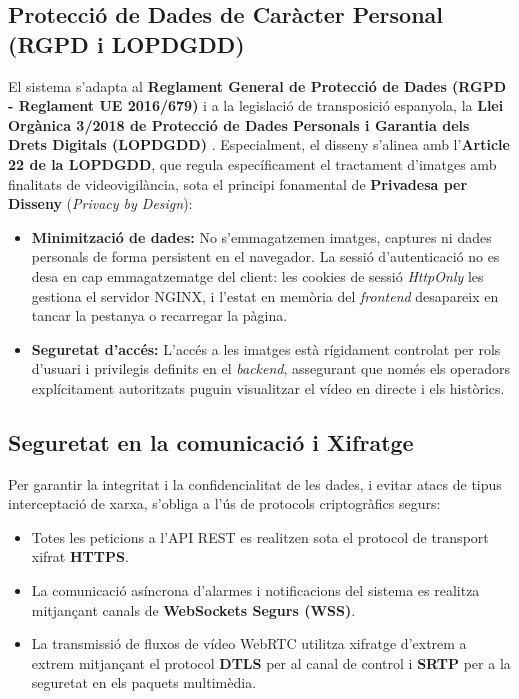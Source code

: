 \subsection{Protecció de Dades de Caràcter Personal (RGPD i LOPDGDD)}
El sistema s'adapta al \textbf{Reglament General de Protecció de Dades (RGPD - Reglament UE 2016/679)} \cite{gdpr_reg} i a la legislació de transposició espanyola, la \textbf{Llei Orgànica 3/2018 de Protecció de Dades Personals i Garantia dels Drets Digitals (LOPDGDD)} \cite{lopdgdd_spain}. Especialment, el disseny s'alinea amb l'\textbf{Article 22 de la LOPDGDD}, que regula específicament el tractament d'imatges amb finalitats de videovigilància, sota el principi fonamental de \textbf{Privadesa per Disseny} (\textit{Privacy by Design}):
\begin{itemize}
  \item \textbf{Minimització de dades:} No s'emmagatzemen imatges, captures ni dades personals de forma persistent en el navegador. La sessió d'autenticació no es desa en cap emmagatzematge del client: les cookies de sessió \textit{HttpOnly} les gestiona el servidor NGINX, i l'estat en memòria del \textit{frontend} desapareix en tancar la pestanya o recarregar la pàgina.
  \item \textbf{Seguretat d'accés:} L'accés a les imatges està rígidament controlat per rols d'usuari i privilegis definits en el \textit{backend}, assegurant que només els operadors explícitament autoritzats puguin visualitzar el vídeo en directe i els històrics.
\end{itemize}

\subsection{Seguretat en la comunicació i Xifratge}
Per garantir la integritat i la confidencialitat de les dades, i evitar atacs de tipus interceptació de xarxa, s'obliga a l'ús de protocols criptogràfics segurs:
\begin{itemize}
  \item Totes les peticions a l'API REST es realitzen sota el protocol de transport xifrat \textbf{HTTPS}.
  \item La comunicació asíncrona d'alarmes i notificacions del sistema es realitza mitjançant canals de \textbf{WebSockets Segurs (WSS)}.
  \item La transmissió de fluxos de vídeo WebRTC utilitza xifratge d'extrem a extrem mitjançant el protocol \textbf{DTLS} per al canal de control i \textbf{SRTP} per a la seguretat en els paquets multimèdia.
\end{itemize}

